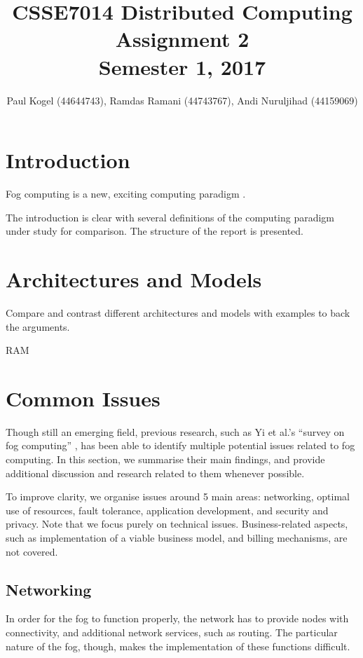 \documentclass{article}
\title{CSSE7014 Distributed Computing \\
Assignment 2 \\
Semester 1, 2017}
\author{Paul Kogel (44644743), Ramdas Ramani (44743767), Andi Nuruljihad (44159069)}
\begin{document}
\maketitle

\pagebreak
\tableofcontents\thispagestyle{plain}

\pagebreak

\section{Introduction}

Fog computing is a new, exciting computing paradigm \cite{bonomi2012fog}.

The introduction is clear with several definitions of the computing paradigm under study for comparison. The structure of the report is presented.

\section{Architectures and Models}
Compare and contrast different architectures and models with examples to back the arguments.

RAM

\pagebreak

\section{Common Issues}

Though still an emerging field, previous research, such as Yi et al.'s ``survey on fog computing'' \cite{yi2015survey}, has been able to identify multiple potential issues related to fog computing. In this section, we summarise their main findings, and provide additional discussion and research related to them whenever possible.

To improve clarity, we organise issues around 5 main areas: networking, optimal use of resources, fault tolerance, application development, and security and privacy. Note that we focus purely on technical issues. Business-related aspects, such as implementation of a viable business model, and billing mechanisms, are not covered.

\subsection{Networking}
In order for the fog to function properly, the network has to provide nodes with connectivity, and additional network services, such as routing. The particular nature of the fog, though, makes the implementation of these functions difficult. 
\end{document}
